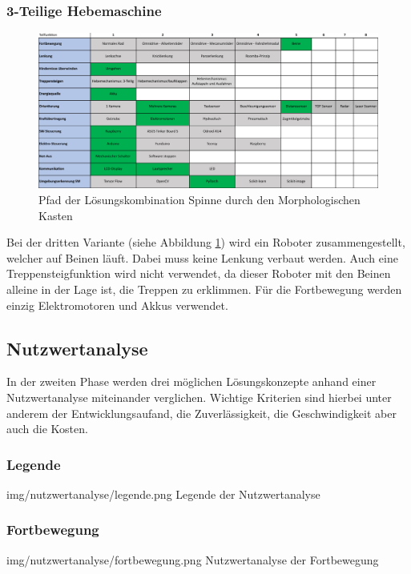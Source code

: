 \subsubsection*{3-Teilige Hebemaschine}
\begin{figure}[h]
  \includegraphics[width=1.0\textwidth]{img/morphologische-kaesten/Morphologischer_Kasten_Spinne.png}
  \centering
  \caption{Pfad der Lösungskombination Spinne durch den Morphologischen Kasten}
  \label{fig:morphologischer-kasten-spinne}
\end{figure}
   
Bei der dritten Variante (siehe Abbildung \ref{fig:morphologischer-kasten-spinne}) wird ein Roboter zusammengestellt, welcher auf Beinen läuft. Dabei muss keine Lenkung verbaut werden. Auch eine Treppensteigfunktion wird nicht verwendet, da dieser Roboter mit den Beinen alleine in der Lage ist, die Treppen zu erklimmen. Für die Fortbewegung werden einzig Elektromotoren und Akkus verwendet.


\subsection*{Nutzwertanalyse}
In der zweiten Phase werden drei möglichen Lösungskonzepte anhand einer Nutzwertanalyse miteinander verglichen. Wichtige Kriterien sind hierbei unter anderem der Entwicklungsaufand, die Zuverlässigkeit, die Geschwindigkeit aber auch die Kosten.

\subsubsection*{Legende}
\image
   {img/nutzwertanalyse/legende.png}
   {Legende der Nutzwertanalyse}

\subsubsection*{Fortbewegung}
\image
   {img/nutzwertanalyse/fortbewegung.png}
   {Nutzwertanalyse der Fortbewegung}
   
